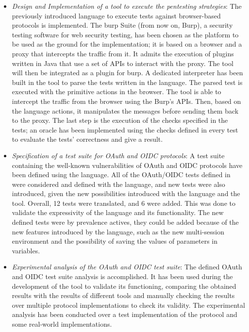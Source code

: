 \begin{itemize}
    \item \textit{Design and Implementation of a tool to execute the pentesting strategies}: The previously introduced language to execute tests against browser-based protocols is implemented. The \gls{burp} Suite (from now on, Burp), a security testing software for web security testing, has been chosen as the platform to be used as the ground for the implementation; it is based on a browser and a proxy that intercepts the traffic from it. It admits the execution of plugins written in Java that use a set of APIs to interact with the proxy. The tool will then be integrated as a plugin for \gls{burp}. A dedicated interpreter has been built in the tool to parse the tests written in the language. The parsed test is executed with the primitive actions in the browser. The tool is able to intercept the traffic from the browser using the Burp's APIs. Then, based on the language actions, it manipulates the messages before sending them back to the proxy. The last step is the execution of the checks specified in the tests; an oracle has been implemented using the checks defined in every test to evaluate the tests' correctness and give a result.
    \item \textit{Specification of a test suite for OAuth and OIDC protocols}: A test suite containing the well-known vulnerabilities of OAuth and OIDC protocols have been defined using the language. All of the OAuth/OIDC tests defined in \cite{claudio_grisenti, wendy_barreto} were considered and defined with the language, and new tests were also introduced, given the new possibilities introduced with the language and the tool. Overall, 12 tests were translated, and 6 were added. This was done to validate the expressivity of the language and its functionality. The new defined tests were by prevalence actives, they could be added because of the new features introduced by the language, such as the new multi-session environment and the possibility of saving the values of parameters in variables.
    \item \textit{Experimental analysis of the OAuth and OIDC test suite}: The defined OAuth and OIDC test suite analysis is accomplished. It has been used during the development of the tool to validate its functioning, comparing the obtained results with the results of different tools and manually checking the results over multiple protocol implementations to check its validity. The experimental analysis has been conducted over a test implementation of the protocol and some real-world implementations.
\end{itemize}

